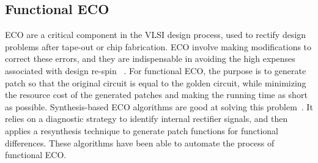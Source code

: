 \subsection{Functional ECO}
ECO are a critical component in the VLSI design process, used to rectify design problems after tape-out or chip fabrication. ECO involve making modifications to correct these errors, and they are indispensable in avoiding the high expenses associated with design re-spin ~\cite{jaeger2007virtually}.
For functional ECO, the purpose is to generate patch so that the original circuit is equal to the golden circuit, while minimizing the resource cost of the generated patches and making the running time as short as possible. Synthesis-based ECO algorithms are good at solving this problem~\cite{huang2013match}. It relies on a diagnostic strategy to identify internal rectifier signals, and then applies a resynthesis technique to generate patch functions for functional differences. These algorithms have been able to automate the process of functional ECO.


